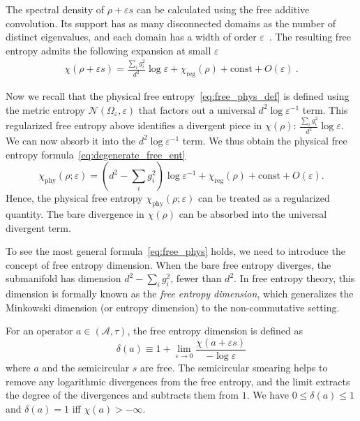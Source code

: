 \documentclass[aps,pre,twocolumn,superscriptaddress,amsmath,amssymb,reprint]{revtex4-2}
\def\eps{\varepsilon}
\def\A{\mathcal{A}}
\begin{document}
The spectral density of $\rho+\eps s$ can be calculated using the free additive convolution. Its support has as many disconnected domains as the number of distinct eigenvalues, and each domain has a width of order $\eps$~\cite{biane1997free}. The resulting free entropy admits the following expansion at small $\eps$
\begin{align}
    \label{eq:smeared_free_ent}
    \chi(\rho+\eps s)
    =\frac{\sum_ig_i^2}{d^2}\log\eps+ \chi_\mathrm{reg}(\rho) + \mathrm{const} + O(\eps)\ .
\end{align}


Now we recall that the physical free entropy~\eqref{eq:free_phys_def} is defined using the metric entropy $\mathcal{N}(\Omega_\eps, \eps)$ that factors out a universal $d^2\log\eps^{-1}$ term. This regularized free entropy above identifies a divergent piece in $\chi(\rho)$: $\frac{\sum_ig_i^2}{d^2}\log\eps$.  We can now absorb it into the $d^2\log\eps^{-1}$ term. We thus obtain the physical free entropy formula~\eqref{eq:degenerate_free_ent}
\begin{equation}
    \chi_\mathrm{phy}(\rho;\eps)=\left(d^2-\sum_ig_i^2\right)\log\eps^{-1} + \chi_\mathrm{reg}(\rho) + \mathrm{const} + O(\eps).
\end{equation}
Hence, the physical free entropy $\chi_\mathrm{phy}(\rho;\eps)$ can be treated as a regularized quantity. The bare divergence in $\chi(\rho)$ can be absorbed into the universal divergent term.

To see the most general formula~\eqref{eq:free_phys} holds, we need to introduce the concept of free entropy dimension. When the bare free entropy diverges, the submanifold has dimension $d^2-\sum_ig_i^2$, fewer than $d^2$. In free entropy theory, this dimension is formally known as the \emph{free entropy dimension}, which generalizes the Minkowski dimension (or entropy dimension) to the non-commutative setting. 

For an operator $a\in(\A,\tau)$, the free entropy dimension is defined as 
\begin{equation}\label{eq:fed}
    \delta(a)\equiv 1+\lim_{\eps\to 0}\frac{\chi(a+\eps s)}{-\log\eps}
\end{equation}
where $a$ and the semicircular $s$ are free. The semicircular smearing helps to remove any logarithmic divergences from the free entropy, and the limit extracts the degree of the divergences and subtracts them from $1$. We have $0\leq\delta(a)\leq 1$ and $\delta(a)=1$ iff $\chi(a)>-\infty$. 
\end{document}

